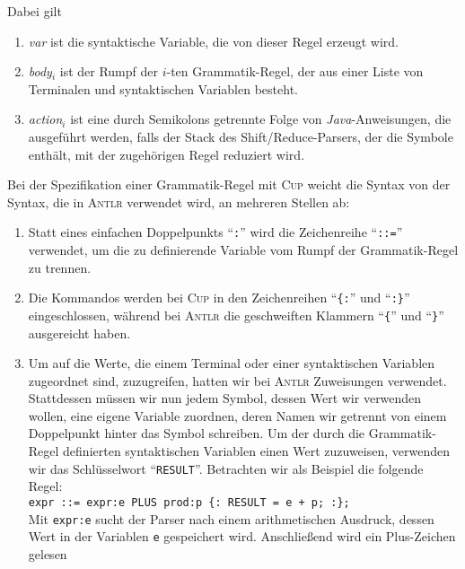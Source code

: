 \begin{enumerate}
      Dabei gilt
      \begin{enumerate}
      \item \textsl{var} ist die syntaktische Variable, die von dieser Regel erzeugt wird.
      \item \textsl{body}$_i$ ist der Rumpf der $i$-ten Grammatik-Regel, der aus einer
            Liste von Terminalen und syntaktischen Variablen besteht.
      \item \textsl{action}$_i$ ist eine durch Semikolons getrennte Folge von \textsl{Java}-Anweisungen,
            die ausgef\"uhrt werden, falls der Stack des Shift/Reduce-Parsers, der die
            Symbole enth\"alt, mit der zugeh\"origen Regel reduziert wird.
      \end{enumerate}
      Bei der Spezifikation einer Grammatik-Regel mit \textsc{Cup} weicht die Syntax von der
      Syntax, die in \textsc{Antlr} verwendet wird, an mehreren Stellen ab: 
      \begin{enumerate}
      \item Statt eines einfachen Doppelpunkts ``\texttt{:}'' wird die Zeichenreihe ``\texttt{::=}''
            verwendet, um die zu definierende Variable vom Rumpf der Grammatik-Regel zu trennen.
      \item Die Kommandos werden bei \textsc{Cup} in den Zeichenreihen ``\texttt{\{:}'' und
            ``\texttt{:\}}'' eingeschlossen, w\"ahrend bei \textsc{Antlr} die geschweiften Klammern
            ``\texttt{\{}'' und ``\texttt{\}}'' ausgereicht haben.
      \item Um auf die Werte, die einem Terminal oder einer syntaktischen Variablen zugeordnet sind,
            zuzugreifen, hatten wir bei \textsc{Antlr} Zuweisungen  verwendet.
            Stattdessen m\"ussen wir nun jedem Symbol, 
            dessen Wert wir verwenden wollen, eine eigene Variable zuordnen, deren Namen wir
            getrennt von einem Doppelpunkt hinter das Symbol schreiben.  Um der durch die
            Grammatik-Regel definierten syntaktischen Variablen einen Wert zuzuweisen, verwenden wir
            das Schl\"usselwort ``\texttt{RESULT}''.  Betrachten wir als Beispiel die folgende Regel:
            \\[0.2cm]
            \hspace*{1.3cm}
            \texttt{expr ::= expr:e PLUS prod:p \{: RESULT = e + p; :\};}
            \\[0.2cm]
            Mit \texttt{expr:e} sucht der Parser nach einem arithmetischen Ausdruck, dessen Wert in
            der Variablen \texttt{e} gespeichert wird.  Anschlie{\ss}end wird ein Plus-Zeichen gelesen

\end{enumerate}
\end{enumerate}
